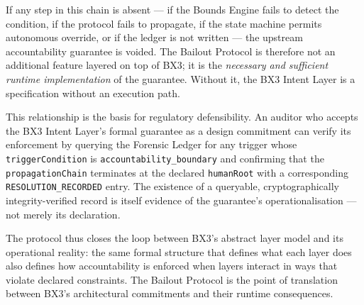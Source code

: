 If any step in this chain is absent --- if the Bounds Engine fails to detect the
condition, if the protocol fails to propagate, if the state machine permits
autonomous override, or if the ledger is not written --- the upstream accountability
guarantee is voided.  The Bailout Protocol is therefore not an additional feature
layered on top of BX3; it is the \emph{necessary and sufficient runtime
implementation} of the guarantee.  Without it, the BX3 Intent Layer is a
specification without an execution path.

This relationship is the basis for regulatory defensibility.  An auditor who accepts
the BX3 Intent Layer's formal guarantee as a design commitment can verify its
enforcement by querying the Forensic Ledger for any trigger whose
\texttt{triggerCondition} is \texttt{accountability\_boundary} and confirming that
the \texttt{propagationChain} terminates at the declared \texttt{humanRoot} with a
corresponding \texttt{RESOLUTION\_RECORDED} entry.  The existence of a queryable,
cryptographically integrity-verified record is itself evidence of the guarantee's
operationalisation --- not merely its declaration.

The protocol thus closes the loop between BX3's abstract layer model and its
operational reality: the same formal structure that defines what each layer does
also defines how accountability is enforced when layers interact in ways that
violate declared constraints.  The Bailout Protocol is the point of translation
between BX3's architectural commitments and their runtime consequences.

